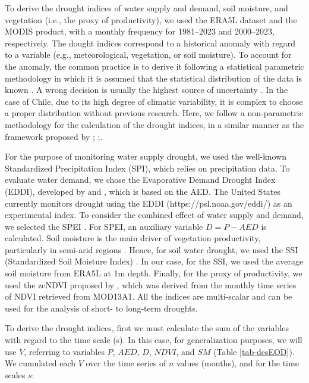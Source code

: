 \documentclass[
  authoryear,
  preprint,
  3p,
  onecolumn]{elsarticle}
\begin{document}
To derive the drought indices of water supply and demand, soil moisture,
and vegetation (i.e., the proxy of productivity), we used the ERA5L
dataset and the MODIS product, with a monthly frequency for 1981--2023
and 2000--2023, respectively. The dought indices correspond to a
historical anomaly with regard to a variable (e.g., meteorological,
vegetation, or soil moisture). To account for the anomaly, the common
practice is to derive it following a statistical parametric methodology
in which it is assumed that the statistical distribution of the data is
known \citep{Heim2002}. A wrong decision is usually the highest source
of uncertainty \citep{Laimighofer2022}. In the case of Chile, due to its
high degree of climatic variability, it is complex to choose a proper
distribution without previous research. Here, we follow a non-parametric
methodology for the calculation of the drought indices, in a similar
manner as the framework proposed by \citet{Farahmand2015};
\citet{Hobbins2016};\citet{McEvoy2016}.

For the purpose of monitoring water supply drought, we used the
well-known Standardized Precipitation Index (SPI), which relies on
precipitation data. To evaluate water demand, we chose the Evaporative
Demand Drought Index (EDDI), developed by \citet{Hobbins2016} and
\citet{McEvoy2016}, which is based on the AED. The United States
currently monitors drought using the EDDI (https://psl.noaa.gov/eddi/)
as an experimental index. To consider the combined effect of water
supply and demand, we selected the SPEI \citep{Vicente-Serrano2010}. For
SPEI, an auxiliary variable \(D = P-AED\) is calculated. Soil moisture
is the main driver of vegetation productivity, particularly in semi-arid
regions \citep{Li2022}. Hence, for soil water drought, we used the SSI
(Standardized Soil Moisture Index) \citep{Hao2013, AghaKouchak2014}. In
our case, for the SSI, we used the average soil moisture from ERA5L at
1m depth. Finally, for the proxy of productivity, we used the zcNDVI
proposed by \citet{Zambrano2018}, which was derived from the monthly
time series of NDVI retrieved from MOD13A1. All the indices are
multi-scalar and can be used for the analysis of short- to long-term
droughts.

To derive the drought indices, first we must calculate the sum of the
variables with regard to the time scale (s). In this case, for
generalization purposes, we will use \(V\), referring to variables
\(P\), \(AED\), \(D\), \(NDVI\), and \(SM\) (Table \ref{tab-desEOD}). We
cumulated each \(V\) over the time series of \(n\) values (months), and
for the time scales \(s\):
\end{document}
